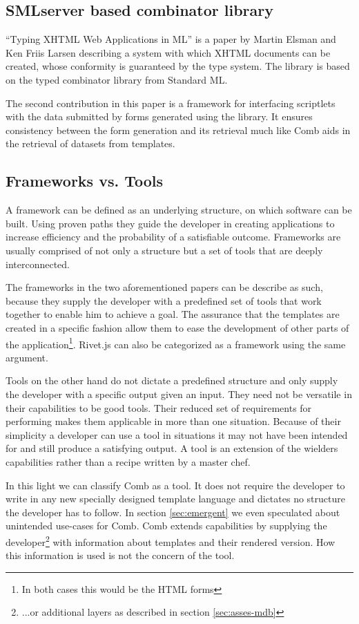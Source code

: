 \documentclass[thesis.tex]{subfiles}
\begin{document}
\subsection{SMLserver based combinator library}
``Typing XHTML Web Applications in ML''\cite{ML} is a paper by Martin Elsman and
Ken Friis Larsen describing a system with which XHTML documents can be created,
whose conformity is guaranteed by the type system. The library is based on the
typed combinator library from Standard ML.

The second contribution in this paper is a framework for interfacing scriptlets
with the data submitted by forms generated using the library.
It ensures consistency between the form generation and its retrieval much like
Comb aids in the retrieval of datasets from templates.



\subsection{Frameworks vs. Tools}
A framework can be defined as an underlying structure, on which software can be
built. Using proven paths they guide the developer in creating applications to
increase efficiency and the probability of a satisfiable outcome.
Frameworks are usually comprised of not only a structure but a set of tools that
are deeply interconnected.

The frameworks in the two aforementioned papers can be describe as such, because
they supply the developer with a predefined set of tools that work together to
enable him to achieve a goal. The assurance that the templates are created in a
specific fashion allow them to ease the development of other parts of the
application\footnote{In both cases this would be the HTML forms}. Rivet.js can
also be categorized as a framework using the same argument.

Tools on the other hand do not dictate a predefined structure and only supply
the developer with a specific output given an input. They need not be versatile
in their capabilities to be good tools. Their reduced set of requirements for
performing makes them applicable in more than one situation. Because of their
simplicity a developer can use a tool in situations it may not have been
intended for and still produce a satisfying output. A tool is an extension of
the wielders capabilities rather than a recipe written by a master chef.

In this light we can classify Comb as a tool. It does not require the developer
to write in any new specially designed template language and dictates no
structure the developer has to follow. In section \ref{sec:emergent} we even
speculated about unintended use-cases for Comb. Comb extends capabilities by
supplying the developer\footnote{...or additional layers as described in
section \ref{sec:asses-mdb}} with information about templates and their
rendered version. How this information is used is not the concern of the tool.
\end{document}
